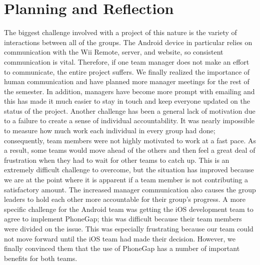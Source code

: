 \documentclass[12pt]{article}
\begin{document}
\section{Planning and Reflection}
The biggest challenge involved with a project of this nature is the variety of interactions between all of the groups.  The Android device in particular relies on communication with the Wii Remote, server, and website, so consistent communication is vital.  Therefore, if one team manager does not make an effort to communicate, the entire project suffers.  We finally realized the importance of human communication and have planned more manager meetings for the rest of the semester.  In addition, managers have become more prompt with emailing and this has made it much easier to stay in touch and keep everyone updated on the status of the project.  Another challenge has been a general lack of motivation due to a failure to create a sense of individual accountability.  It was nearly impossible to measure how much work each individual in every group had done; consequently, team members were not highly motivated to work at a fast pace.  As a result, some teams would move ahead of the others and then feel a great deal of frustration when they had to wait for other teams to catch up.  This is an extremely difficult challenge to overcome, but the situation has improved because we are at the point where it is apparent if a team member is not contributing a satisfactory amount.  The increased manager communication also causes the group leaders to hold each other more accountable for their group’s progress.  A more specific challenge for the Android team was getting the iOS development team to agree to implement PhoneGap; this was difficult because their team members were divided on the issue.  This was especially frustrating because our team could not move forward until the iOS team had made their decision.  However, we finally convinced them that the use of PhoneGap has a number of important benefits for both teams.
\end{document}
